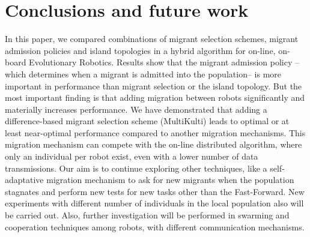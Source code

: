 \documentclass[runningheads]{llncs}
\begin{document}
\section{Conclusions and future work}
In this paper, we compared combinations of migrant selection schemes, migrant admission policies and island topologies in a hybrid algorithm for  on-line, on-board Evolutionary Robotics. 
Results show that the migrant admission policy --which determines when a migrant is admitted into the population-- is more important in performance than migrant selection or the island topology. 
But the most important finding is that adding migration between robots significantly and materially increases performance. We have demonstrated that adding a difference-based migrant selection scheme (MultiKulti) leads to optimal or at least near-optimal performance compared to another migration mechanisms. This migration mechanism can compete with the on-line distributed algorithm, where only an individual per robot exist, even with a lower number of data transmissions.
Our aim is to continue exploring other techniques, like a self-adaptative migration mechanism to ask for new migrants when the population stagnates and perform new tests for new tasks other than the Fast-Forward. New experiments with different number of individuals in the local population also will be carried out. Also, further investigation will be performed in swarming and cooperation techniques among robots, with different communication mechanisms.
\end{document}

